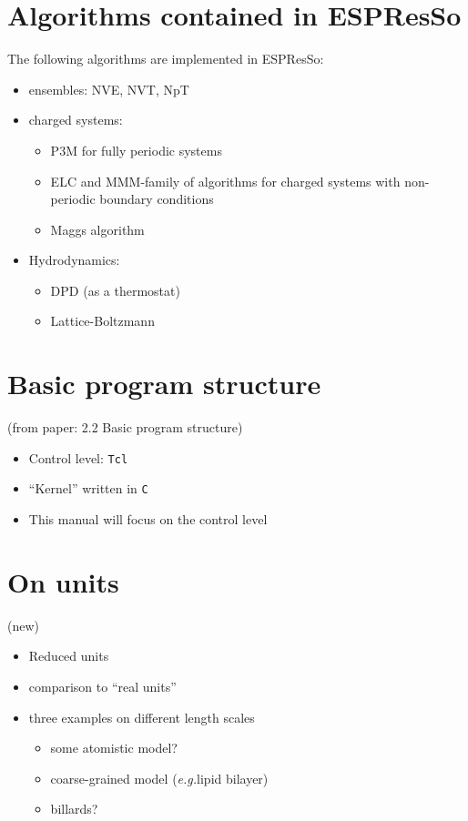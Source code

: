 \documentclass[
a4paper,                        %
11pt,                           %
twoside,                        %
footsepline,                    %
headsepline,                    %
headexclude,                    %
footexclude,                    %
pagesize,                       %
bibtotocnumbered,               %
idxtotoc                        %
]{scrreprt}
\newcommand{\es}{\textsf{ESPResSo}}
\newcommand{\eg}{\textit{e.g.\/}}
\begin{document}
\section{Algorithms contained in \es}

The following algorithms are implemented in \es{}:

\begin{itemize}
\item ensembles: NVE, NVT, NpT
\item charged systems:
  \begin{itemize}
  \item P3M for fully periodic systems
  \item ELC and MMM-family of algorithms for charged systems with
    non-periodic boundary conditions
  \item Maggs algorithm 
  \end{itemize}
\item Hydrodynamics:
  \begin{itemize}
  \item DPD (as a thermostat)
  \item Lattice-Boltzmann
  \end{itemize}
\end{itemize}

\section{Basic program structure}
\label{sec:structure}

(from paper: 2.2 Basic program structure)

\begin{itemize}
\item Control level: \texttt{Tcl}
\item ``Kernel'' written in \texttt{C}
\item This manual will focus on the control level
\end{itemize}

\section{On units}
\label{sec:units}

(new)

\begin{itemize}
\item Reduced units
\item comparison to ``real units''
\item three examples on different length scales
  \begin{itemize}
  \item some atomistic model?
  \item coarse-grained model (\eg lipid bilayer)
  \item billards?
  \end{itemize}
\end{itemize}
\end{document}
